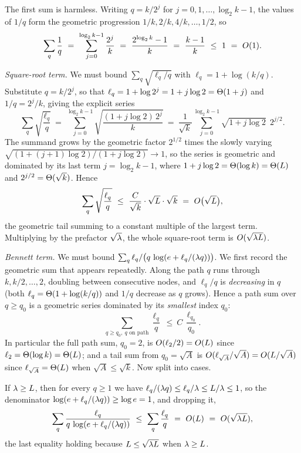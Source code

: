 The first sum is harmless. Writing $q=k/2^j$ for $j=0,1,\dots,\log_2 k-1$, the values of $1/q$ form the geometric
progression $1/k,2/k,4/k,\dots,1/2$, so
\[
  \sum_{q} \frac1q\ =\ \sum_{j=0}^{\log_2 k-1}\frac{2^j}{k}\ =\ \frac{2^{\log_2 k}-1}{k}\ =\ \frac{k-1}{k}\ \le\ 1\ =\ \Oh(1).
\]

\emph{Square-root term.} We must bound $\sum_q\sqrt{\ell_q/q}$ with $\ell_q=1+\log(k/q)$. Substitute $q=k/2^j$, so that
$\ell_q=1+\log 2^j=1+j\log 2=\Theta(1+j)$ and $1/q=2^j/k$, giving the explicit series
\[
  \sum_{q}\sqrt{\frac{\ell_q}{q}}\ =\ \sum_{j=0}^{\log_2 k-1}\sqrt{\frac{(1+j\log 2)\,2^j}{k}}\ =\ \frac1{\sqrt k}\sum_{j=0}^{\log_2 k-1}\sqrt{1+j\log 2}\;\,2^{j/2}.
\]
The summand grows by the geometric factor $2^{1/2}$ times the slowly varying $\sqrt{(1+(j+1)\log2)/(1+j\log2)}\to1$, so the
series is geometric and dominated by its last term $j=\log_2 k-1$, where $1+j\log2=\Theta(\log k)=\Theta(L)$ and
$2^{j/2}=\Theta(\sqrt k)$. Hence
\[
  \sum_{q}\sqrt{\frac{\ell_q}{q}}\ \le\ \frac{C}{\sqrt k}\cdot\sqrt{\Lscale}\cdot\sqrt k\ =\ \Oh\big(\sqrt{\Lscale}\big),
\]
the geometric tail summing to a constant multiple of the largest term. Multiplying by the prefactor $\sqrt{\lambda}$, the whole
square-root term is $O(\sqrt{\lambda L})$.

\emph{Bennett term.} We must bound $\sum_q \ell_q/\big(q\,\log(e+\ell_q/(\lambda q))\big)$. We first record the geometric sum
that appears repeatedly. Along the path $q$ runs through $k,k/2,\dots,2$, doubling between consecutive nodes, and
$\ell_q/q$ is \emph{decreasing} in $q$ (both $\ell_q=\Theta(1+\log(k/q))$ and $1/q$ decrease as $q$ grows). Hence a path sum over
$q\ge q_0$ is a geometric series dominated by its \emph{smallest} index $q_0$:
\[
  \sum_{q\ge q_0,\ q\text{ on path}}\frac{\ell_q}{q}\ \le\ C\,\frac{\ell_{q_0}}{q_0}.
\]
In particular the full path sum, $q_0=2$, is $O(\ell_2/2)=O(L)$ since $\ell_2=\Theta(\log k)=\Theta(L)$; and a tail
sum from $q_0=\sqrt A$ is $O(\ell_{\sqrt A}/\sqrt A)=O(L/\sqrt A)$ since $\ell_{\sqrt A}=\Theta(L)$ when
$\sqrt A\le\sqrt k$. Now split into cases.

If $\lambda\ge L$, then for every $q\ge1$ we have $\ell_q/(\lambda q)\le\ell_q/\lambda\le L/\lambda\le 1$, so the denominator
$\log(e+\ell_q/(\lambda q))\ge\log e=1$, and dropping it,
\[
  \sum_q \frac{\ell_q}{q\,\log(e+\ell_q/(\lam q))}\ \le\ \sum_q\frac{\ell_q}{q}\ =\ \Oh(\Lscale)\ =\ \Oh(\sqrt{\lam\Lscale}),
\]
the last equality holding because $L\le\sqrt{\lambda L}$ when $\lambda\ge L$.

